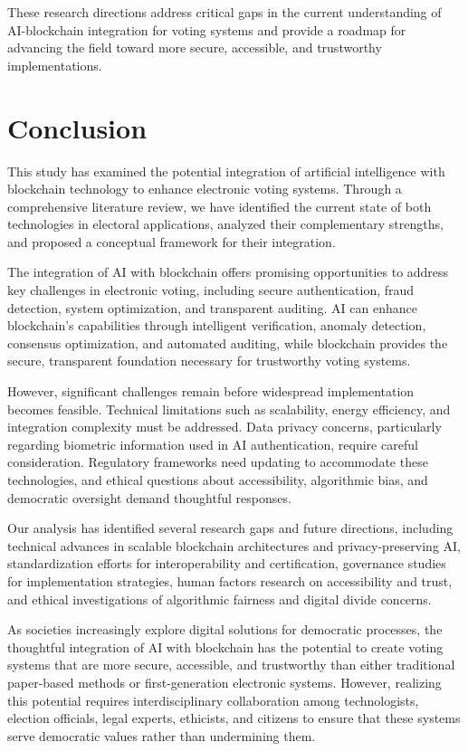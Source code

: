 \documentclass[conference]{IEEEtran}
\begin{document}
These research directions address critical gaps in the current understanding of AI-blockchain integration for voting systems and provide a roadmap for advancing the field toward more secure, accessible, and trustworthy implementations.

\section{Conclusion}
This study has examined the potential integration of artificial intelligence with blockchain technology to enhance electronic voting systems. Through a comprehensive literature review, we have identified the current state of both technologies in electoral applications, analyzed their complementary strengths, and proposed a conceptual framework for their integration.

The integration of AI with blockchain offers promising opportunities to address key challenges in electronic voting, including secure authentication, fraud detection, system optimization, and transparent auditing. AI can enhance blockchain's capabilities through intelligent verification, anomaly detection, consensus optimization, and automated auditing, while blockchain provides the secure, transparent foundation necessary for trustworthy voting systems.

However, significant challenges remain before widespread implementation becomes feasible. Technical limitations such as scalability, energy efficiency, and integration complexity must be addressed. Data privacy concerns, particularly regarding biometric information used in AI authentication, require careful consideration. Regulatory frameworks need updating to accommodate these technologies, and ethical questions about accessibility, algorithmic bias, and democratic oversight demand thoughtful responses.

Our analysis has identified several research gaps and future directions, including technical advances in scalable blockchain architectures and privacy-preserving AI, standardization efforts for interoperability and certification, governance studies for implementation strategies, human factors research on accessibility and trust, and ethical investigations of algorithmic fairness and digital divide concerns.

As societies increasingly explore digital solutions for democratic processes, the thoughtful integration of AI with blockchain has the potential to create voting systems that are more secure, accessible, and trustworthy than either traditional paper-based methods or first-generation electronic systems. However, realizing this potential requires interdisciplinary collaboration among technologists, election officials, legal experts, ethicists, and citizens to ensure that these systems serve democratic values rather than undermining them.
\end{document}
